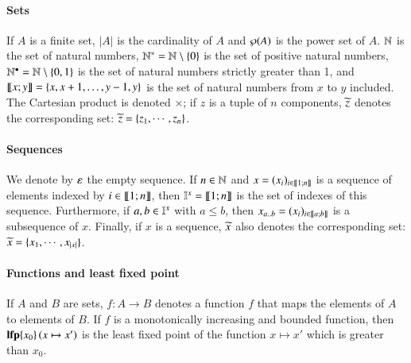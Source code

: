 \paragraph*{Sets}
If $A$ is a finite set,
$|A|$ is the cardinality of $A$
and $\wp(A)$ is the power set of $A$.
$\mathbb{N}$ is the set of natural numbers,
$\mathbb{N}^* = \mathbb{N} \setminus \{ 0 \}$ is the set of positive natural numbers,
$\mathbb{N}^\bullet = \mathbb{N} \setminus \{ 0, 1 \}$ is the set of natural numbers strictly greater than 1,
and $\llbracket x; y \rrbracket = \{ x, x+1, \dots, y-1, y \}$ is the set of natural numbers from $x$ to $y$ included.
The Cartesian product is denoted $\times$;
if $z$ is a tuple of $n$ components, $\widetilde{z}$ denotes the corresponding set:
$\widetilde{z} = \{z_1, \cdots, z_n\}$.

\paragraph*{Sequences}
We denote by $\varepsilon$ the empty sequence.
If $n \in \mathbb{N}$ and
$x = (x_i)_{i \in \llbracket 1; n \rrbracket}$ is a sequence of elements indexed by $i \in \llbracket 1; n \rrbracket$,
then $\mathbb{I}^{x} = \llbracket 1; n \rrbracket$ is the set of indexes of this sequence.
Furthermore, if $a, b \in \mathbb{I}^{x}$ with $a \leq b$,
then $x_{a..b} = (x_i)_{i \in \llbracket a; b \rrbracket}$ is a subsequence of $x$.
Finally, if $x$ is a sequence, $\widetilde{x}$ also denotes the corresponding set:
$\widetilde{x} = \{x_1, \cdots, x_{|x|}\}$.

\paragraph*{Functions and least fixed point}
If $A$ and $B$ are sets,
$f : A \rightarrow B$ denotes a function $f$ that maps the elements of $A$ to elements of $B$.
If $f$ is a monotonically increasing and bounded function, then
$\mathbf{lfp}\{x_0\}\left(x\mapsto x'\right)$ is the least fixed point of the function $x \mapsto x'$ which is greater than $x_0$.

